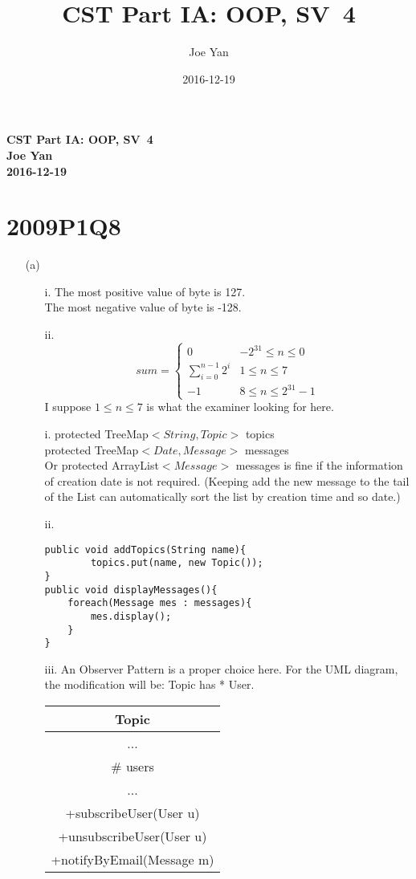 \documentclass[10pt,twoside,a4paper]{article}
\newcommand{\studentname}{Joe Yan}
\newcommand{\svworkdate}{2016-12-19}
\newcommand{\svcourse}{CST Part IA: OOP}
\newcommand{\svnumber}{4}
\begin{document}
\author{\studentname}
\title{\svcourse, SV~\svnumber}
\date{\svworkdate}

\textbf{\svcourse, SV~\svnumber}\\
\textbf{\studentname}\\
\textbf{\svworkdate}\\

\section{2009P1Q8}
\begin{enumerate}
\item[(a)]
\begin{enumerate}
\item[i.]
The most positive value of byte is 127.\\
The most negative value of byte is -128.
\item[ii.]
\[sum=\begin{cases}
0
&\text{$-2^{31} \leqslant n\leqslant 0$ }\\
\sum_{i=0}^{n-1}{2^i}
&\text{$1\leqslant n \leqslant 7$}\\
-1
&\text{$8 \leqslant n \leqslant 2^{31}-1$}
\end{cases}\]
I suppose $1\leqslant n \leqslant 7$ is what the examiner looking for here.
\end{enumerate}
\begin{enumerate}
\item[i.]
protected TreeMap$<String,Topic>$ topics\\
protected TreeMap$<Date,Message>$ messages\\
Or protected ArrayList$<Message>$ messages is fine if the information of creation date is not required. (Keeping add the new message to the tail of the List can automatically sort the list by creation time and so date.)

\item[ii.]
\begin{lstlisting}
public void addTopics(String name){
		topics.put(name, new Topic());
}
public void displayMessages(){
	foreach(Message mes : messages){
		mes.display();
	}
}
\end{lstlisting}
\item[iii.]
An Observer Pattern is a proper choice here.
For the UML diagram, the modification will be: Topic has * User.\\
\begin{tabular}{|c|}
\hline 
Topic \\ 
\hline 
... \\ 
\# users \\ 
\hline 
... \\ 
+subscribeUser(User u) \\ 
+unsubscribeUser(User u) \\ 
+notifyByEmail(Message m) \\ 
\hline 
\end{tabular} 


\end{enumerate}
\end{enumerate}
\end{document}
